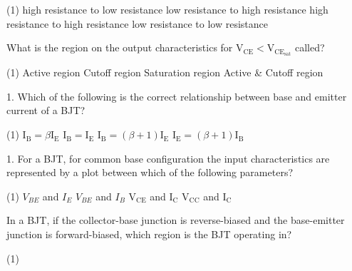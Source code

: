 \begin{enumerate}
\begin{minipage}{\textwidth}
\end{minipage}
\begin{tasks}(1)
	\task[\textbf{A.}] high resistance to low resistance
	\task[\textbf{B.}] low resistance to high resistance
	\task[\textbf{C.}]high resistance to high resistance
	\task[\textbf{D.}]low resistance to low resistance
\end{tasks}
\begin{minipage}{\textwidth}
	\item  What is the region on the output characteristics for $\mathrm{V}_{\mathrm{CE}}<\mathrm{V}_{\mathrm{CE}_{\mathrm{sat}}}$ called?
\end{minipage}
\begin{tasks}(1)
	\task[\textbf{A.}]  Active region
	\task[\textbf{B.}] Cutoff region
	\task[\textbf{C.}]Saturation region
	\task[\textbf{D.}]Active \& Cutoff region
\end{tasks}
\begin{minipage}{\textwidth}
	\item 1. Which of the following is the correct relationship between base and emitter current of a BJT?
\end{minipage}
\begin{tasks}(1)
	\task[\textbf{A.}]$\mathrm{I}_{\mathrm{B}}=\beta \mathrm{I}_{\mathrm{E}}$ 
	\task[\textbf{B.}] $\mathrm{I}_{\mathrm{B}}=\mathrm{I}_{\mathrm{E}}$
	\task[\textbf{C.}]$\mathrm{I}_{\mathrm{B}}=(\beta+1) \mathrm{I}_{\mathrm{E}}$
	\task[\textbf{D.}]$\mathrm{I}_{\mathrm{E}}=(\beta+1) \mathrm{I}_{\mathrm{B}}$
\end{tasks}
\begin{minipage}{\textwidth}
	\item 1. For a BJT, for common base configuration the input characteristics are represented by a plot between which of the following parameters?
\end{minipage}
\begin{tasks}(1)
	\task[\textbf{A.}] $V_{B E}$ and $I_{E}$
	\task[\textbf{B.}] $V_{B E}$ and $I_{B}$
	\task[\textbf{C.}]$\mathrm{V}_{\mathrm{CE}}$ and $\mathrm{I}_{\mathrm{C}}$
	\task[\textbf{D.}] $\mathrm{V}_{\mathrm{CC}}$ and $\mathrm{I}_{\mathrm{C}}$
\end{tasks}
\begin{minipage}{\textwidth}
	\item In a BJT, if the collector-base junction is reverse-biased and the base-emitter junction is forward-biased, which region is the BJT operating in?
\end{minipage}
\begin{tasks}(1)

\end{tasks}
\end{enumerate}
